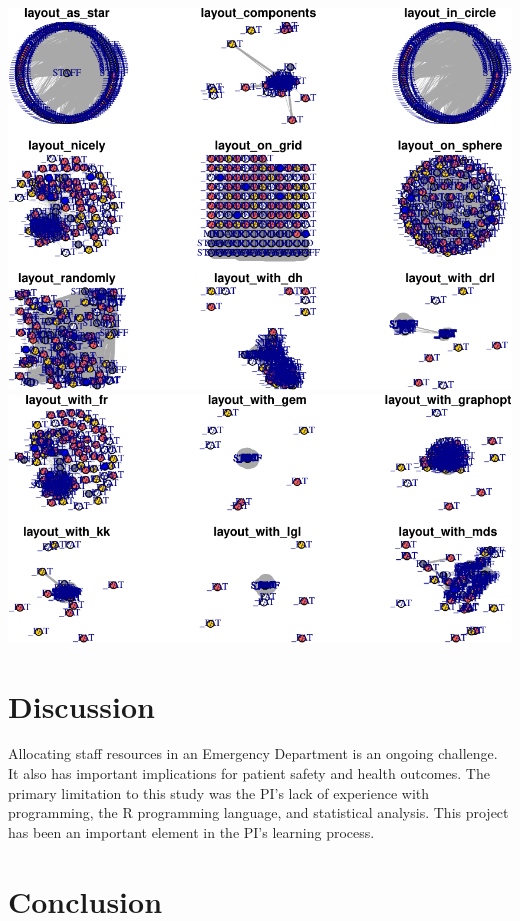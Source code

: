 \documentclass[]{elsarticle} %
\makeatletter
\def\maxwidth{\ifdim\Gin@nat@width>\linewidth\linewidth
\else\Gin@nat@width\fi}
\let\Oldincludegraphics\includegraphics
\renewcommand{\includegraphics}[1]{\Oldincludegraphics[width=\maxwidth]{#1}}
\makeatother
\begin{document}
\includegraphics{Flynn_Project_files/figure-latex/unnamed-chunk-1-1.pdf}
\includegraphics{Flynn_Project_files/figure-latex/unnamed-chunk-1-2.pdf}

\section{Discussion}\label{discussion}

Allocating staff resources in an Emergency Department is an ongoing
challenge. It also has important implications for patient safety and
health outcomes. The primary limitation to this study was the PI's lack
of experience with programming, the R programming language, and
statistical analysis. This project has been an important element in the
PI's learning process.

\section{Conclusion}\label{conclusion}
\end{document}
